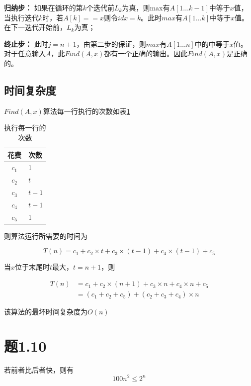\documentclass[a4paper,twoside]{article}
\begin{document}
\begin{spacing}{1.2}
\textbf{归纳步：} 如果在循环的第$k$个迭代前$L_{k}$为真，则max有$A[1 \dots k-1]$中等于$x$值，当执行迭代$k$时，若$A[k] == x$则令$idx=k$。此时$max$有$A[1 \dots k]$中等于$x$值。在下一迭代开始前，$L_k$为真；

\textbf{终止步：} 此时$j=n+1$，由第二步的保证，则$max$有$A[1 \dots n]$中的中等于$x$值。
对于任意输入$A$，此$Find(A,x)$都有一个正确的输出。因此$Find(A,x)$是正确的。

\subsection{时间复杂度}
$Find(A,x)$算法每一行执行的次数如表\ref{tbl:p19}
\begin{table}[h]
	\renewcommand{\arraystretch}{1.2}
	\caption{执行每一行的次数}
	\label{tbl:p19}
	\begin{center}
		{\footnotesize
			\begin{tabular}{c l}
				\toprule
				{花费} & {次数} \\
				\midrule
				$c_1$ & 1 \\
				\hline
				$c_2$ & $t$ \\
				\hline
				$c_3$ & $t-1$ \\
				\hline
				$c_4$ & $t-1$ \\
				\hline
				$c_5$ & 1 \\
				\bottomrule
		\end{tabular}}
	\end{center}
\end{table}


则算法运行所需要的时间为

\begin{equation}
	T(n)=c_1 + c_2 \times t + c_3 \times (t-1) + c_4 \times (t-1) + c_5 \label{eqn:tn19}
\end{equation}

当$x$位于末尾时$t$最大，$t=n+1$，则

\begin{align*}
	T(n)&=c_1 + c_2 \times (n+1) + c_3 \times n + c_4 \times n  + c_5 \\
	&= (c_1+c_2+c_5)+(c_2+c_3+c_4) \times n
\end{align*}

该算法的最坏时间复杂度为$O(n)$

\section{题1.10}

若前者比后者快，则有
$$
100n^2 \le 2^n
$$


\end{spacing}
\end{document}
